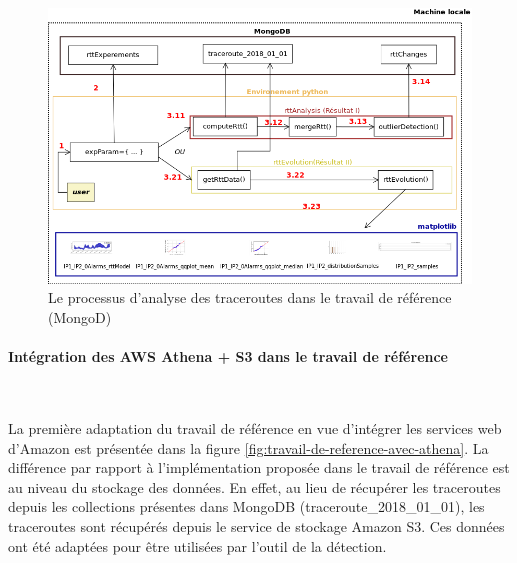 \begin{figure}[H]
\centering
\includegraphics[width=1\linewidth]{illustrations/travail-de-reference}
\caption{Le processus d'analyse des traceroutes dans le travail de référence (MongoD)}
\label{fig:travail-de-reference}
\end{figure}

\paragraph{Intégration des AWS  Athena + S3 dans le travail de référence} \label{par:aws-stockage-seulement}~


La première adaptation du travail de référence en vue d'intégrer les services web d'Amazon est présentée dans la figure \ref{fig:travail-de-reference-avec-athena}. La différence par rapport à l'implémentation proposée dans le travail de référence est au niveau du stockage des données. En effet, au lieu de récupérer les traceroutes depuis les collections présentes dans MongoDB (traceroute\_2018\_01\_01), les traceroutes sont récupérés depuis  le service de stockage Amazon S3. Ces données ont été adaptées pour être utilisées par l'outil de la détection.


